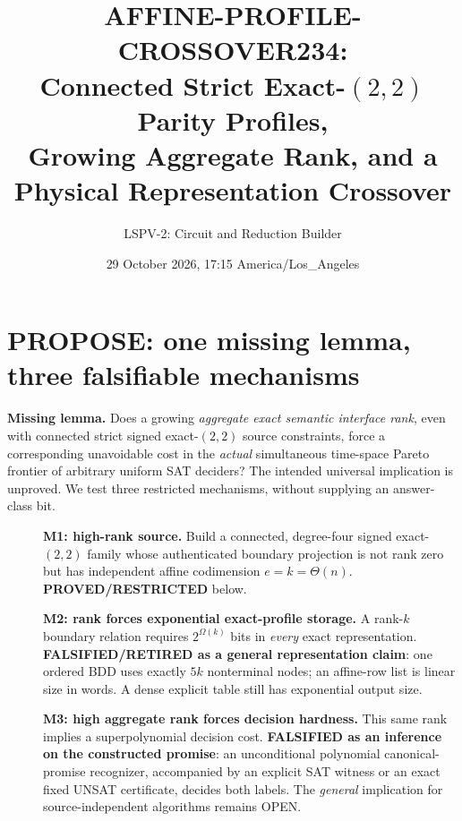 \documentclass[10pt]{article}
\title{AFFINE-PROFILE-CROSSOVER234:\\Connected Strict Exact-$(2,2)$ Parity Profiles,\\Growing Aggregate Rank, and a Physical Representation Crossover}
\author{LSPV-2: Circuit and Reduction Builder}
\date{29 October 2026, 17:15 America/Los\_Angeles}
\begin{document}
\maketitle
\noindent{}\medskip

\section{PROPOSE: one missing lemma, three falsifiable mechanisms}
\noindent\textbf{Missing lemma.} Does a growing \emph{aggregate exact semantic interface rank}, even with connected strict signed exact-$(2,2)$ source constraints, force a corresponding unavoidable cost in the \emph{actual} simultaneous time-space Pareto frontier of arbitrary uniform SAT deciders? The intended universal implication is unproved. We test three restricted mechanisms, without supplying an answer-class bit.
\begin{description}
\item[] \textbf{M1: high-rank source.} Build a connected, degree-four signed exact-$(2,2)$ family whose authenticated boundary projection is not rank zero but has independent affine codimension $e=k=\Theta(n)$. \textbf{PROVED/RESTRICTED} below.
\item[] \textbf{M2: rank forces exponential exact-profile storage.} A rank-$k$ boundary relation requires $2^{\Omega(k)}$ bits in \emph{every} exact representation. \textbf{FALSIFIED/RETIRED as a general representation claim}: one ordered BDD uses exactly $5k$ nonterminal nodes; an affine-row list is linear size in words. A dense explicit table still has exponential output size.
\item[] \textbf{M3: high aggregate rank forces decision hardness.} This same rank implies a superpolynomial decision cost. \textbf{FALSIFIED as an inference on the constructed promise}: an unconditional polynomial canonical-promise recognizer, accompanied by an explicit SAT witness or an exact fixed UNSAT certificate, decides both labels. The \emph{general} implication for source-independent algorithms remains OPEN.
\end{description}
\end{document}
